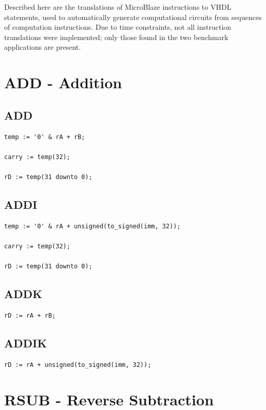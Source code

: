\documentclass{UoYCSproject}
\begin{document}
Described here are the translations of MicroBlaze instructions to VHDL statements, used to automatically
generate computational circuits from sequences of computation instructions. Due to time constraints, not all
instruction translations were implemented; only those found in the two benchmark applications are present.

\section{ADD - Addition}

\subsection{ADD}

\begin{lstlisting}
temp := '0' & rA + rB;

carry := temp(32);

rD := temp(31 downto 0);
\end{lstlisting}

\subsection{ADDI}

\begin{lstlisting}
temp := '0' & rA + unsigned(to_signed(imm, 32));

carry := temp(32);

rD := temp(31 downto 0);
\end{lstlisting}

\subsection{ADDK}

\begin{lstlisting}
rD := rA + rB;
\end{lstlisting}

\subsection{ADDIK}

\begin{lstlisting}
rD := rA + unsigned(to_signed(imm, 32));
\end{lstlisting}

\section{RSUB - Reverse Subtraction}
\end{document}
